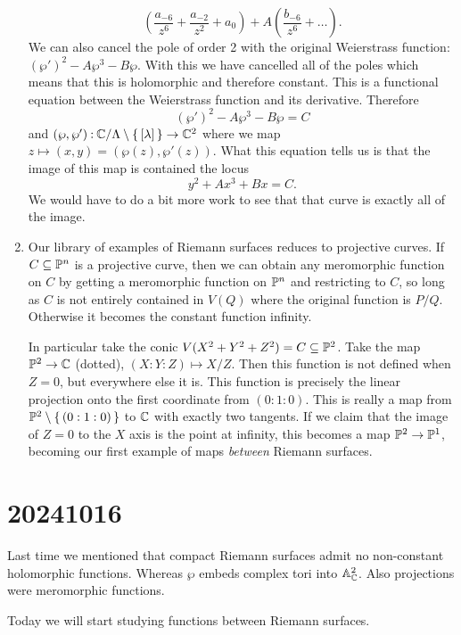 \documentclass[12pt]{memoir}
\begin{document}
\begin{Ex}
\begin{enumerate}
        $$\left(\frac{a_{-6}}{z^6}+\frac{a_{-2}}{z^2}+a_0\right)+A\left(\frac{b_{-6}}{z^6}+\dots\right).$$
        We can also cancel the pole of order 2 with the original Weierstrass function: $(\wp')^2-A\wp^3-B\wp$. With this we have cancelled all of the poles which means that this is holomorphic and therefore constant. This is a functional equation between the Weierstrass function and its derivative. Therefore
        $$(\wp')^2-A\wp^3-B\wp=C$$
        and $(\wp,\wp')\mathbin{:}\mathbb{C}/\Lambda\setminus\{\,\left\lbrack\lambda\right\rbrack\,\}\to\mathbb{C}^2$ where we map $z\mapsto(x,y)=(\wp(z),\wp'(z))$. What this equation tells us is that the image of this map is contained the locus 
        $$y^2+Ax^3+Bx=C.$$
        We would have to do a bit more work to see that that curve is exactly all of the image.
        \item Our library of examples of Riemann surfaces reduces to projective curves. If $C\subseteq\mathbb{P}^n$ is a projective curve, then we can obtain any meromorphic function on $C$ by getting a meromorphic function on $\mathbb{P}^n$ and restricting to $C$, so long as $C$ is not entirely contained in $V(Q)$ where the original function is $P/Q$. Otherwise it becomes the constant function infinity.\par
        In particular take the conic $V(X^2+Y^2+Z^2)=C\subseteq\mathbb{P}^2$. Take the map $\mathbb{P}^2\to\mathbb{C}$ (dotted), $(X:Y:Z)\mapsto X/Z$. Then this function is not defined when $Z=0$, but everywhere else it is. This function is precisely the linear projection onto the first coordinate from $(0:1:0)$. This is really a map from $\mathbb{P}^2\setminus\{\,(0:1:0)\,\}$ to $\mathbb{C}$ with exactly two tangents. If we claim that the image of $Z=0$ to the $X$ axis is the point at infinity, this becomes a map $\mathbb{P}^2\to\mathbb{P}^1$, becoming our first example of maps \emph{between} Riemann surfaces.
    \end{enumerate}
\end{Ex}


\section{20241016}

Last time we mentioned that compact Riemann surfaces admit no non-constant holomorphic functions. Whereas $\wp$ embeds complex tori into $\mathbb{A}^2_{\mathbb{C}}$. Also projections were meromorphic functions.\par
Today we will start studying functions between Riemann surfaces.
\end{document}
